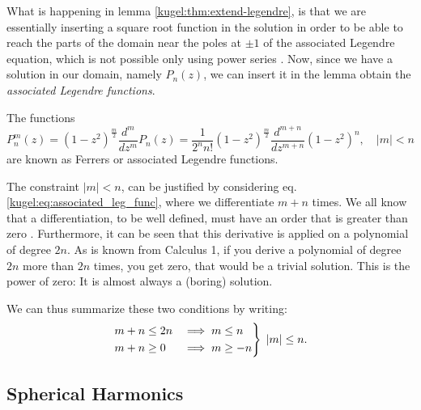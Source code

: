 What is happening in lemma \ref{kugel:thm:extend-legendre}, is that we are
essentially inserting a square root function in the solution in order to be able
to reach the parts of the domain near the poles at $\pm 1$ of the associated
Legendre equation, which is not possible only using power series
. Now, since
we have a solution in our domain, namely $P_n(z)$, we can insert it in the lemma 
obtain the \emph{associated Legendre functions}.

\begin{definition}
  \label{kugel:def:ferrers-functions}
  The functions
  \begin{equation}
    P^m_n (z) = (1-z^2)^{\frac{m}{2}}\frac{d^{m}}{dz^{m}} P_n(z)
      = \frac{1}{2^n n!}(1-z^2)^{\frac{m}{2}}\frac{d^{m+n}}{dz^{m+n}}(1-z^2)^n, \quad |m|<n
  \end{equation}
  are known as Ferrers or associated Legendre functions.
\end{definition}
The constraint $|m|<n$, can be justified by considering eq.\eqref{kugel:eq:associated_leg_func}, where we differentiate $m+n$ times. We all know that a differentiation, to be well defined, must have an order that is greater than zero . Furthermore, it can be seen that this derivative is applied on a polynomial of degree $2n$. As is known from Calculus 1, if you derive a polynomial of degree $2n$ more than $2n$ times, you get zero, that would be a trivial solution. This is the power of zero: It is almost always a (boring) solution.

We can thus summarize these two conditions by writing:
\begin{equation*}
    \begin{rcases}
        m+n \leq 2n &\implies m \leq n \\
        m+n \geq 0  &\implies  m \geq -n
    \end{rcases} \; |m| \leq n.
\end{equation*}

\subsection{Spherical Harmonics}

